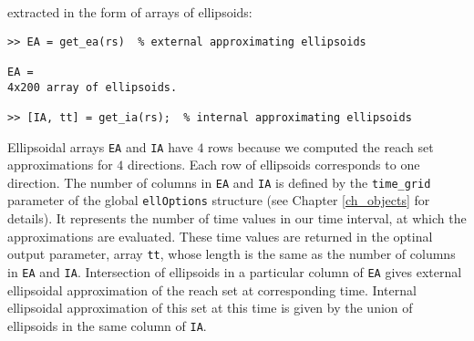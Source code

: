 extracted in the form of arrays of ellipsoids:
{\tt \begin{verbatim}
>> EA = get_ea(rs)  % external approximating ellipsoids

EA =
4x200 array of ellipsoids.

>> [IA, tt] = get_ia(rs);  % internal approximating ellipsoids
\end{verbatim} }
Ellipsoidal arrays {\tt EA} and {\tt IA} have $4$ rows because we computed
the reach set approximations for $4$ directions. Each row of ellipsoids
corresponds to one direction. The number of columns in {\tt EA} and {\tt IA}
is defined by the {\tt time\_grid} parameter of the global {\tt ellOptions}
structure (see Chapter \ref{ch_objects} for details).
It represents the number of time values
in our time interval, at which the approximations are evaluated. These
time values are returned in the optinal output parameter, array {\tt tt},
whose length is the same as the number of columns in {\tt EA} and {\tt IA}.
Intersection of ellipsoids in a particular column of {\tt EA} gives
external ellipsoidal approximation of the reach set at corresponding time.
Internal ellipsoidal approximation of this set at this time is given by the
union of ellipsoids in the same column of {\tt IA}.


